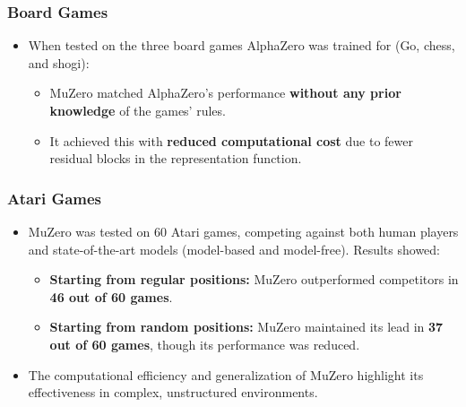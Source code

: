 \subsubsection{Board Games}
\begin{itemize}
    \item When tested on the three board games AlphaZero was trained for (Go, chess, and
          shogi):
          \begin{itemize}
              \item MuZero matched AlphaZero's performance \textbf{without any prior knowledge} of
                    the games' rules.
              \item It achieved this with \textbf{reduced computational cost} due to fewer residual
                    blocks in the representation function.
          \end{itemize}
\end{itemize}

\subsubsection{Atari Games}
\begin{itemize}
    \item MuZero was tested on 60 Atari games, competing against both human players and
          state-of-the-art models (model-based and model-free). Results showed:
          \begin{itemize}
              \item \textbf{Starting from regular positions:} MuZero outperformed competitors in \textbf{46 out of 60 games}.
              \item \textbf{Starting from random positions:} MuZero maintained its lead in \textbf{37 out of 60 games}, though its performance was reduced.
          \end{itemize}
    \item The computational efficiency and generalization of MuZero highlight its
          effectiveness in complex, unstructured environments.
\end{itemize}


